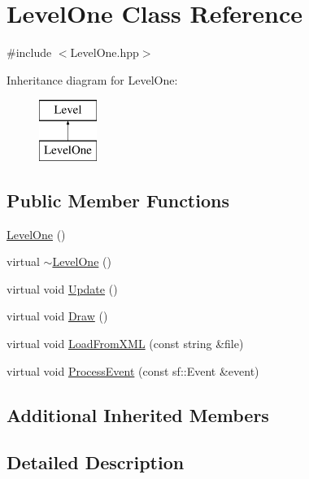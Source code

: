 \hypertarget{class_level_one}{\section{Level\-One Class Reference}
\label{class_level_one}
}


{\ttfamily \#include $<$Level\-One.\-hpp$>$}

Inheritance diagram for Level\-One\-:\begin{figure}[H]
\begin{center}
\leavevmode
\includegraphics[height=2.000000cm]{class_level_one}
\end{center}
\end{figure}
\subsection*{Public Member Functions}
\begin{DoxyCompactItemize}
\item 
\hyperlink{class_level_one_a3fe4df62466654e6e7617377c8bd67a7}{Level\-One} ()
\item 
virtual \hyperlink{class_level_one_a43952923e3867bbdf882d18ac809ae34}{$\sim$\-Level\-One} ()
\item 
virtual void \hyperlink{class_level_one_ad0078eaa35f035c1a6ec7bf0bbef2fba}{Update} ()
\item 
virtual void \hyperlink{class_level_one_ac39dc2f3934694f3428737b97001ff41}{Draw} ()
\item 
virtual void \hyperlink{class_level_one_a6ff4ce4a9eaeb94987f897e47de62856}{Load\-From\-X\-M\-L} (const string \&file)
\item 
virtual void \hyperlink{class_level_one_ab806ffec162c436857edd2539e8f3d4e}{Process\-Event} (const sf\-::\-Event \&event)
\end{DoxyCompactItemize}
\subsection*{Additional Inherited Members}


\subsection{Detailed Description}


